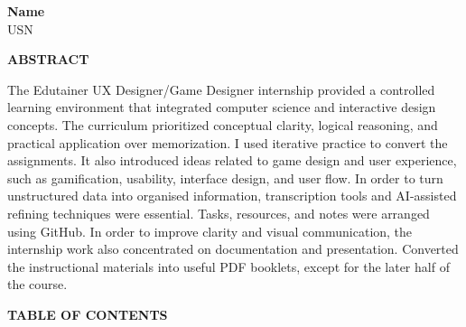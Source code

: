 \documentclass[15pt,a4paper,twocolumn,fleqn]{article}
\begin{document}
\vspace{0.7cm}

{\Large
\begin{flushright}
\textbf{Name}\\
USN
\end{flushright}
}


\newpage

\thispagestyle{myfancypage}
\thispagestyle{numbered}

\begin{center}
{\LARGE \textbf{ABSTRACT}}\\[1cm]
\end{center}

\setlength{\parskip}{6pt}
\setlength{\parindent}{15pt}

{\large
The Edutainer UX Designer/Game Designer internship provided a controlled learning environment that integrated computer science and interactive design concepts. The curriculum prioritized conceptual clarity, logical reasoning, and practical application over memorization.
I used iterative practice to convert the assignments. It also introduced ideas related to game design and user experience, such as gamification, usability, interface design, and user flow.
In order to turn unstructured data into organised information, transcription tools and AI-assisted refining techniques were essential. Tasks, resources, and notes were arranged using GitHub. In order to improve clarity and visual communication, the internship work also concentrated on documentation and presentation. Converted the instructional materials into useful PDF booklets, except for the later half of the course.
}

\newpage
\thispagestyle{numbered}

\begin{center}
{\Large \textbf{TABLE OF CONTENTS}}\\[0.4cm]
\end{center}

\renewcommand{\arraystretch}{1.1}
\setlength{\tabcolsep}{4pt}
\end{document}
